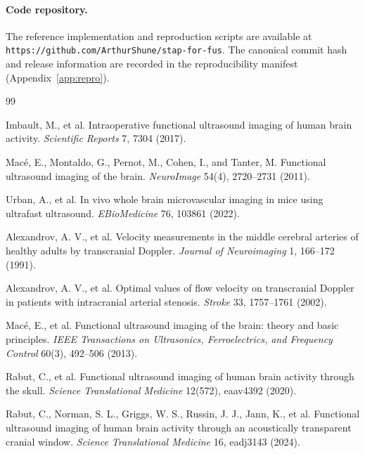 \documentclass[11pt]{article}
\DeclareRobustCommand{\path}[1]{\nolinkurl{#1}}
\newif\ifSTAPPAPERONLY
\newcommand{\SuppOrApp}[1]{\ifSTAPPAPERONLY Supplementary Material\else Appendix~\ref{#1}\fi}
\begin{document}
\paragraph{Code repository.}
The reference implementation and reproduction scripts are available at \path{https://github.com/ArthurShune/stap-for-fus}. The canonical commit hash and release information are recorded in the reproducibility manifest (\SuppOrApp{app:repro}).

\fi %
\FloatBarrier
\begin{thebibliography}{99}
\raggedright

Imbault, M., et al.
\newblock Intraoperative functional ultrasound imaging of human brain activity.
\newblock \emph{Scientific Reports} 7, 7304 (2017).

Mac{\'e}, E., Montaldo, G., Pernot, M., Cohen, I., and Tanter, M.
\newblock Functional ultrasound imaging of the brain.
\newblock \emph{NeuroImage} 54(4), 2720--2731 (2011).

Urban, A., et al.
\newblock In vivo whole brain microvascular imaging in mice using ultrafast ultrasound.
\newblock \emph{EBioMedicine} 76, 103861 (2022).

Alexandrov, A. V., et al.
\newblock Velocity measurements in the middle cerebral arteries of healthy adults by transcranial Doppler.
\newblock \emph{Journal of Neuroimaging} 1, 166--172 (1991).

Alexandrov, A. V., et al.
\newblock Optimal values of flow velocity on transcranial Doppler in patients with intracranial arterial stenosis.
\newblock \emph{Stroke} 33, 1757--1761 (2002).

Mac{\'e}, E., et al.
\newblock Functional ultrasound imaging of the brain: theory and basic principles.
\newblock \emph{IEEE Transactions on Ultrasonics, Ferroelectrics, and Frequency Control} 60(3), 492--506 (2013).

Rabut, C., et al.
\newblock Functional ultrasound imaging of human brain activity through the skull.
\newblock \emph{Science Translational Medicine} 12(572), eaav4392 (2020).

Rabut, C., Norman, S. L., Griggs, W. S., Russin, J. J., Jann, K., et al.
\newblock Functional ultrasound imaging of human brain activity through an acoustically transparent cranial window.
\newblock \emph{Science Translational Medicine} 16, eadj3143 (2024).


\end{thebibliography}
\end{document}
